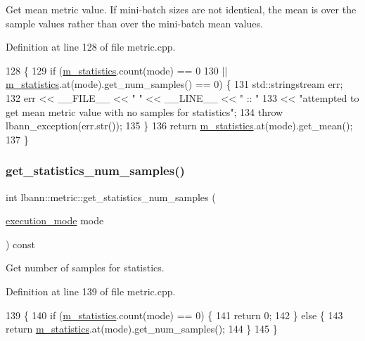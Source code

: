 Get mean metric value. If mini-\/batch sizes are not identical, the mean is over the sample values rather than over the mini-\/batch mean values. 

Definition at line 128 of file metric.\+cpp.


\begin{DoxyCode}
128                                                          \{
129   \textcolor{keywordflow}{if} (\hyperlink{classlbann_1_1metric_a9949d8aceedbc113aa2c356046ed73fc}{m\_statistics}.count(mode) == 0
130       || \hyperlink{classlbann_1_1metric_a9949d8aceedbc113aa2c356046ed73fc}{m\_statistics}.at(mode).get\_num\_samples() == 0) \{
131     std::stringstream err;
132     err << \_\_FILE\_\_ << \textcolor{stringliteral}{" "} << \_\_LINE\_\_ << \textcolor{stringliteral}{" :: "}
133         << \textcolor{stringliteral}{"attempted to get mean metric value with no samples for statistics"};
134     \textcolor{keywordflow}{throw} lbann\_exception(err.str());
135   \}
136   \textcolor{keywordflow}{return} \hyperlink{classlbann_1_1metric_a9949d8aceedbc113aa2c356046ed73fc}{m\_statistics}.at(mode).get\_mean();
137 \}
\end{DoxyCode}
\mbox{\label{classlbann_1_1metric_a489feb28d318bd8405133f9f8c94cc10}} 
\subsubsection{\texorpdfstring{get\+\_\+statistics\+\_\+num\+\_\+samples()}{get\_statistics\_num\_samples()}}
{\footnotesize\ttfamily int lbann\+::metric\+::get\+\_\+statistics\+\_\+num\+\_\+samples (\begin{DoxyParamCaption}\item[{\hyperlink{base_8hpp_a2781a159088df64ed7d47cc91c4dc0a8}{execution\+\_\+mode}}]{mode }\end{DoxyParamCaption}) const}

Get number of samples for statistics. 

Definition at line 139 of file metric.\+cpp.


\begin{DoxyCode}
139                                                                 \{
140   \textcolor{keywordflow}{if} (\hyperlink{classlbann_1_1metric_a9949d8aceedbc113aa2c356046ed73fc}{m\_statistics}.count(mode) == 0) \{
141     \textcolor{keywordflow}{return} 0;
142   \} \textcolor{keywordflow}{else} \{
143     \textcolor{keywordflow}{return} \hyperlink{classlbann_1_1metric_a9949d8aceedbc113aa2c356046ed73fc}{m\_statistics}.at(mode).get\_num\_samples();
144   \}
145 \}
\end{DoxyCode}
\mbox{\label{classlbann_1_1metric_aba7f7a12aeba6619f7b4330e9075f76e}} 
